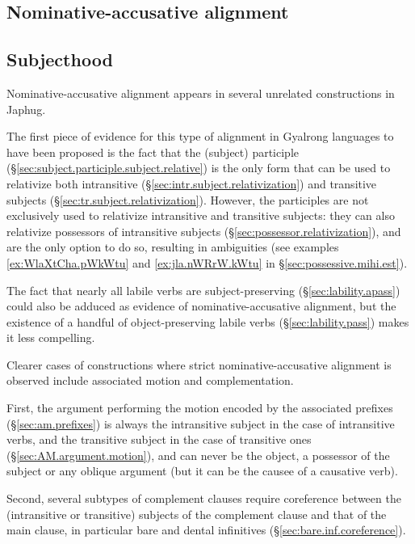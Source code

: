 \subsection{Nominative-accusative alignment}
 
 \subsection{Subjecthood}
    
Nominative-accusative alignment appears in several unrelated constructions in Japhug. 

The first piece of evidence for this type of alignment in Gyalrong languages to have been proposed \citep{jackson03caodeng} is the fact that the  (subject) participle (§\ref{sec:subject.participle.subject.relative}) is the only form that can be used to relativize both intransitive (§\ref{sec:intr.subject.relativization}) and transitive subjects (§\ref{sec:tr.subject.relativization}). However, the   participles are not exclusively used to relativize intransitive and transitive subjects: they can also relativize possessors of intransitive subjects (§\ref{sec:possessor.relativization}), and are the only option to do so, resulting in ambiguities (see examples \ref{ex:WlaXtCha.pWkWtu} and \ref{ex:jla.nWRrW.kWtu} in §\ref{sec:possessive.mihi.est}).

The fact that nearly all labile verbs are subject-preserving (§\ref{sec:lability.apass})  could also be adduced as evidence of nominative-accusative alignment, but the existence of a handful of  object-preserving labile verbs (§\ref{sec:lability.pass}) makes it less compelling.
 
 Clearer cases of constructions where strict nominative-accusative alignment is observed include associated motion and complementation.
 
First, the argument performing the motion encoded by the associated prefixes (§\ref{sec:am.prefixes}) is always the intransitive subject in the case of intransitive verbs, and the transitive subject in the case of transitive ones (§\ref{sec:AM.argument.motion}), and can never be the object, a possessor of the subject or any oblique argument (but it can be the causee of a causative verb).
 
 Second, several subtypes of complement clauses require coreference between the (intransitive or transitive) subjects of the complement clause and that of the main clause, in particular bare and dental infinitives (§\ref{sec:bare.inf.coreference}).
 
